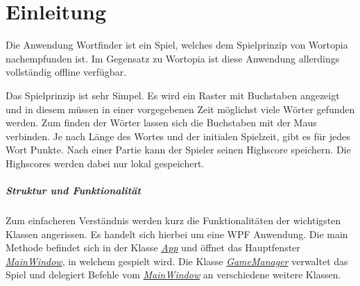 \chapter{Einleitung}

Die Anwendung \glqq Wortfinder\grqq{} ist ein Spiel, welches dem Spielprinzip von Wortopia nachempfunden ist. Im Gegensatz zu Wortopia ist diese Anwendung allerdings vollständig offline verfügbar.

Das Spielprinzip ist sehr Simpel. Es wird ein Raster mit Buchstaben angezeigt und in diesem müssen in einer vorgegebenen Zeit möglichst viele Wörter gefunden werden. Zum finden der Wörter lassen sich die Buchstaben mit der Maus verbinden. Je nach Länge des Wortes und der initialen Spielzeit, gibt es für jedes Wort Punkte. Nach einer Partie kann der Spieler seinen Highscore speichern. Die Highscores werden dabei nur lokal gespeichert.


\paragraph{Struktur und Funktionalität}
Zum einfacheren Verständnis werden kurz die Funktionalitäten der wichtigsten Klassen angerissen. Es handelt sich hierbei um eine WPF Anwendung. Die main Methode befindet sich in der Klasse \href{https://github.com/EinToni/Wortfinder/blob/main/Wortfinder/App.xaml.cs}{\textit{App}} und öffnet das Hauptfenster \href{https://github.com/EinToni/Wortfinder/blob/main/Wortfinder/MainWindow.xaml.cs}{\textit{MainWindow}}, in welchem gespielt wird. Die Klasse \href{https://github.com/EinToni/Wortfinder/blob/main/Wortfinder/GameManager.cs}{\textit{GameManager}} verwaltet das Spiel und delegiert Befehle vom \href{https://github.com/EinToni/Wortfinder/blob/main/Wortfinder/MainWindow.xaml.cs}{\textit{MainWindow}} an verschiedene weitere Klassen.


